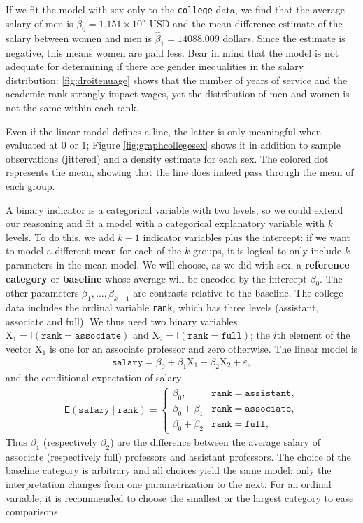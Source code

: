 \documentclass[
  11pt,
  letterpaper,
]{book}
\theoremstyle{definition}
\theoremstyle{definition}
\theoremstyle{definition}
\theoremstyle{remark}
\begin{document}
If we fit the model with sex only to the \texttt{college} data, we find that the average salary of men is \(\widehat{\beta}_0=\ensuremath{1.151\times 10^{5}}\) USD and the mean difference estimate of the salary between women and men is \(\widehat{\beta}_1=14088.009\) dollars. Since the estimate is negative, this means women are paid less. Bear in mind that the model is not adequate for determining if there are gender inequalities in the salary distribution: \ref{fig:droitenuage} shows that the number of years of service and the academic rank strongly impact wages, yet the distribution of men and women is not the same within each rank.

Even if the linear model defines a line, the latter is only meaningful when evaluated at \(0\) or \(1\); Figure \ref{fig:graphcollegesex} shows it in addition to sample observations (jittered) and a density estimate for each sex. The colored dot represents the mean, showing that the line does indeed pass through the mean of each group.

A binary indicator is a categorical variable with two levels, so we could extend our reasoning and fit a model with a categorical explanatory variable with \(k\) levels. To do this, we add \(k-1\) indicator variables plus the intercept: if we want to model a different mean for each of the \(k\) groups, it is logical to only include \(k\) parameters in the mean model. We will choose, as we did with sex, a \textbf{reference category} or \textbf{baseline} whose average will be encoded by the intercept \(\beta_0\). The other parameters \(\beta_1, \ldots, \beta_{k-1}\) are contrasts relative to the baseline. The college data includes the ordinal variable \texttt{rank}, which has three levels (assistant, associate and full). We thus need two binary variables, \(\mathrm{X}_1 = \mathsf{I}(\texttt{rank}=\texttt{associate})\) and \(\mathrm{X}_2 = \mathsf{I}(\texttt{rank}=\texttt{full})\); the \(i\)th element of the vector \(\mathrm{X}_1\) is one for an associate professor and zero otherwise. The linear model is
\begin{align*}
\texttt{salary} =\beta_0 + \beta_1 \mathrm{X}_1+\beta_2\mathrm{X}_2 + \varepsilon,
\end{align*}
and the conditional expectation of salary
\begin{align*}
\mathsf{E}(\texttt{salary} \mid \texttt{rank})= \begin{cases}
\beta_0, & \texttt{rank}=\texttt{assistant},\\
\beta_0 + \beta_1 & \texttt{rank}=\texttt{associate},\\
\beta_0 + \beta_2 & \texttt{rank}=\texttt{full},
\end{cases}
\end{align*}
Thus \(\beta_1\) (respectively \(\beta_2\)) are the difference between the average salary of associate (respectively full) professors and assistant professors. The choice of the baseline category is arbitrary and all choices yield the same model: only the interpretation changes from one parametrization to the next. For an ordinal variable, it is recommended to choose the smallest or the largest category to ease comparisons.
\end{document}
